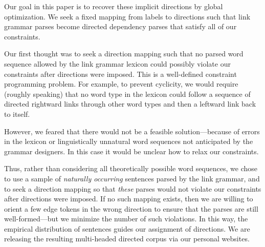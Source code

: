 \documentclass[a4paper,11pt]{article}
\newcommand{\Note}[4][]{\todo[author=#2,color=#3,fancyline,#1]{#4}}
\newcommand{\noteJE}[2][]{\Note[size=\small,#1]{JE}{green!40}{#2}}
\begin{document}

Our goal in this paper is to recover these implicit directions by global optimization.  We seek a fixed mapping from labels to directions such that link grammar parses become directed dependency parses that satisfy all of our constraints.

Our first thought was to seek a direction mapping such that no parsed word sequence allowed by the link grammar lexicon could possibly violate our constraints after directions were imposed.  This is a well-defined constraint programming problem.  For example, to prevent cyclicity, we would require (roughly speaking) that no word type in the lexicon could follow a sequence of directed rightward links through other word types and then a leftward link back to itself.  

However, we feared that there would not be a feasible solution---because of errors in the lexicon or linguistically unnatural word sequences not anticipated by the grammar designers.  In this case it would be unclear how to relax our constraints.

Thus, rather than considering all theoretically possible word sequences, we chose to use a sample of {\em naturally occurring} sentences parsed by the link grammar, and to seek a direction mapping so that {\em these} parses would not violate our constraints after directions were imposed. 
If no such mapping exists, then we are willing to orient a few edge tokens in the wrong direction to ensure that the parses are still well-formed---but we minimize the number of such violations.  In this way, the empirical distribution of sentences guides our assignment of directions.  We are releasing the resulting multi-headed directed corpus via our personal websites. \noteJE{is this the best way?}

\end{document}

